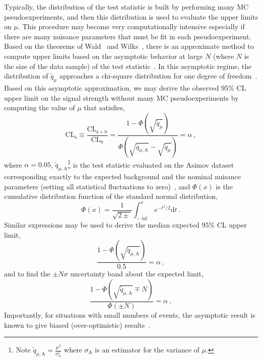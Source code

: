 Typically, the distribution of the test statistic is built by
performing many MC pseudoexperiments, and then this distribution is used to
evaluate the upper limits on $\mu$. This procedure may become very
computationally intensive especially if there are many nuisance
parameters that must be fit in each pseudoexperiment. Based on the
theorems of Wald~\cite{Wald} and Wilks~\cite{Wilks:1938dza}, there is an approximate method to
compute upper limits based on the asymptotic behavior at large $N$
(where $N$ is the size of the data sample) of the test
statistic~\cite{Cowan:2010js}. In this asymptotic regime, the
distribution of $\tilde q_{\mu}$ approaches a chi-square distribution
for one degree of freedom~\cite{Wilks:1938dza}. Based on this asymptotic approximation, we
may derive the observed 95\% CL upper limit on the signal strength
without many MC pseudoexperiments by computing the value of $\mu$ that satisfies,
\begin{equation}
\mathrm{CL}_{\mathrm{s}}\equiv
\frac{\mathrm{CL}_{\mathrm{s+b}}}{\mathrm{CL}_{\mathrm{b}}} = 
\frac{1-\Phi(\sqrt{\tilde
    q_{\mu}})}{\Phi(\sqrt{\tilde q_{\mu,\mathrm{A}}} - \sqrt{\tilde
    q_{\mu}} ) } = \alpha ~,
\end{equation}
where $\alpha = 0.05$, $\tilde q_{\mu,\mathrm{A}}$\footnote{Note $\tilde
  q_{\mu,\mathrm{A}} = \frac{\mu^2}{\sigma_{\mathrm{A}}^2}$ where
  $\sigma_{\mathrm{A}}$ is an estimator for the variance of $\mu$.} is the test statistic evaluated on
the Asimov dataset~\cite{Asimov} corresponding exactly to the expected
background and the nominal nuisance parameters (setting all
statistical fluctuations to zero)~\cite{Cowan:2010js,LHCCLs}, and 
$\Phi(x)$ is the cumulative distribution function of the standard
normal distribution,
\begin{equation}
\Phi(x) = \frac{1}{\sqrt{2\pm}}\int_{-\inf}^xe^{-t^2/2}\mathrm{d}t~.
\end{equation}
Similar
expressions may be used to derive the median expected 95\% CL upper limit, 
\begin{equation}
\frac{1-\Phi(\sqrt{\tilde q_{\mu,\mathrm{A}}})}{0.5} = \alpha ~,
\end{equation}
and to find the $\pm N\sigma$ uncertainty band about the expected limit,
\begin{equation}
\frac{1-\Phi(\sqrt{\tilde q_{\mu,\mathrm{A}}}\mp N)}{\Phi(\pm N)} = \alpha~,
\end{equation}
Importantly, for situations with small numbers of events, the
asymptotic result is known to give biased (over-optimistic) results~\cite{LHCCLs}.

